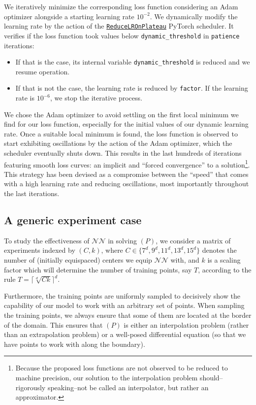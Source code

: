 \documentclass[12pt]{report} %
\begin{document}
We iteratively minimize the corresponding loss function considering an Adam optimizer alongside a starting learning rate $10^{-2}$. We dynamically modify the learning rate by the action of the \href{https://pytorch.org/docs/stable/generated/torch.optim.lr_scheduler.ReduceLROnPlateau.html}{\texttt{ReduceLROnPlateau}} PyTorch scheduler. It verifies if the loss function took values below \texttt{dynamic\_threshold} in \texttt{patience} iterations:
\begin{itemize}
  \item If that is the case, its internal variable \texttt{dynamic\_threshold} is reduced and we resume operation.
  \item If that is not the case, the learning rate is reduced by \texttt{factor}. If the learning rate is $10^{-6}$, we stop the iterative process.
\end{itemize}

We chose the Adam optimizer to avoid settling on the first local minimum we find for our loss function, especially for the initial values of our dynamic learning rate. Once a suitable local minimum is found, the loss function is observed to start exhibiting oscillations by the action of the Adam optimizer, which the scheduler eventually shuts down. This results in the last hundreds of iterations featuring smooth loss curves: an implicit and ``forced convergence'' to a solution\footnote{Because the proposed loss functions are not observed to be reduced to machine precision, our solution to the interpolation problem should--rigorously speaking--not be called an interpolator, but rather an approximator.}. This strategy has been devised as a compromise between the ``speed'' that comes with a high learning rate and reducing oscillations, most importantly throughout the last iterations.

\subsection{A generic experiment case}

To study the effectiveness of $\mathcal{NN}$ in solving $(P)$, we consider a matrix of experiments indexed by $(C,k)$, where $C \in \{7^d,9^d,11^d,13^d,15^d\}$ denotes the number of (initially equispaced) centers we equip $\mathcal{NN}$ with, and $k$ is a scaling factor which will determine the number of training points, say $T$, according to the rule
$T = \lceil \sqrt[d]{C  k} \rceil ^d $. 

Furthermore, the training points are uniformly sampled to decisively show the capability of our model to work with an arbitrary set of points. When sampling the training points, we always ensure that some of them are located at the border of the domain. This ensures that $(P)$ is either an interpolation problem (rather than an extrapolation problem) or a well-posed differential equation (so that we have points to work with along the boundary).
\end{document}
